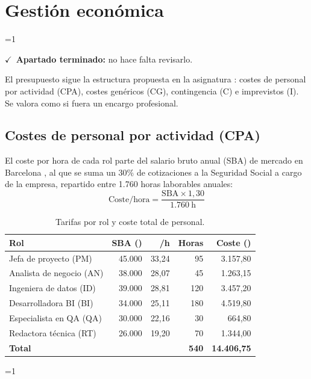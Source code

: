 \documentclass[12pt, a4paper, oneside]{report}
\newcommand{\mostrarterminados}{1}
\newenvironment{revisado}
  {\ifnum\mostrarterminados=1\relax\begin{cajarevisada}\noindent\colorbox{verdeterminado}{\parbox{\dimexpr\linewidth-2\fboxsep\relax}{\small$\checkmark$\ \textbf{Apartado terminado:} no hace falta revisarlo.}}\par\medskip\fi}
  {\ifnum\mostrarterminados=1\relax\end{cajarevisada}\fi}
\begin{document}
\chapter{Gestión económica}
\begin{revisado}
El presupuesto sigue la estructura propuesta en la asignatura \cite{fib_costos}: costes de personal por actividad (CPA), costes genéricos (CG), contingencia (C) e imprevistos (I). Se valora como si fuera un encargo profesional.

\section{Costes de personal por actividad (CPA)}
El coste por hora de cada rol parte del salario bruto anual (SBA) de mercado en Barcelona \cite{glassdoor_barcelona}, al que se suma un 30\% de cotizaciones a la Seguridad Social a cargo de la empresa, repartido entre 1.760 horas laborables anuales:
\begin{equation}
\text{Coste/hora} = \frac{\text{SBA} \times 1{,}30}{1.760\ \text{h}}
\end{equation}

\begin{table}[H]
\centering
\small
\renewcommand{\arraystretch}{1.05}
\begin{tabularx}{\textwidth}{@{} X r r r r @{}}
\toprule
\textbf{Rol} & \textbf{SBA (\texteuro{})} & \textbf{\texteuro{}/h} & \textbf{Horas} & \textbf{Coste (\texteuro{})} \\ \midrule
Jefa de proyecto (PM) & 45.000 & 33,24 & 95 & 3.157,80 \\
Analista de negocio (AN) & 38.000 & 28,07 & 45 & 1.263,15 \\
Ingeniera de datos (ID) & 39.000 & 28,81 & 120 & 3.457,20 \\
Desarrolladora BI (BI) & 34.000 & 25,11 & 180 & 4.519,80 \\
Especialista en QA (QA) & 30.000 & 22,16 & 30 & 664,80 \\
Redactora técnica (RT) & 26.000 & 19,20 & 70 & 1.344,00 \\ \midrule
\textbf{Total} & & & \textbf{540} & \textbf{14.406,75} \\ \bottomrule
\end{tabularx}
\caption{Tarifas por rol y coste total de personal.}
\label{tab:tarifas}
\end{table}


\end{revisado}
\end{document}
